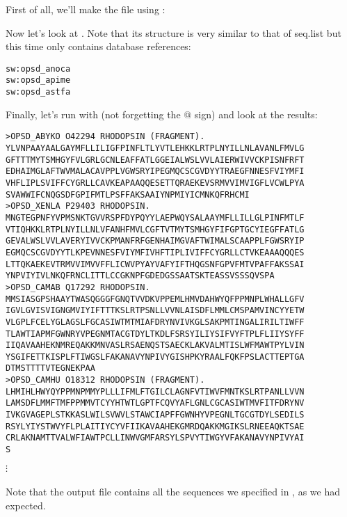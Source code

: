 \documentclass[12pt]{report}
\begin{document}
First of all, we'll make the file  using
:

\unix{}

Now let's look at .	Note that its structure	is very
similar	to that	of seq.list but	this time only contains	database
references:

\unix{}
\begin{verbatim}
sw:opsd_anoca
sw:opsd_apime
sw:opsd_astfa
\end{verbatim}

Finally, let's run  with  (not forgetting the @
sign) and look at the results:

\unix{}

\unix{}
\begin{verbatim}
>OPSD_ABYKO O42294 RHODOPSIN (FRAGMENT).
YLVNPAAYAALGAYMFLLILIGFPINFLTLYVTLEHKKLRTPLNYILLNLAVANLFMVLG
GFTTTMYTSMHGYFVLGRLGCNLEAFFATLGGEIALWSLVVLAIERWIVVCKPISNFRFT
EDHAIMGLAFTWVMALACAVPPLVGWSRYIPEGMQCSCGVDYYTRAEGFNNESFVIYMFI
VHFLIPLSVIFFCYGRLLCAVKEAPAAQQESETTQRAEKEVSRMVVIMVIGFLVCWLPYA
SVAWWIFCNQGSDFGPIFMTLPSFFAKSAAIYNPMIYICMNKQFRHCMI
>OPSD_XENLA P29403 RHODOPSIN.
MNGTEGPNFYVPMSNKTGVVRSPFDYPQYYLAEPWQYSALAAYMFLLILLGLPINFMTLF
VTIQHKKLRTPLNYILLNLVFANHFMVLCGFTVTMYTSMHGYFIFGPTGCYIEGFFATLG
GEVALWSLVVLAVERYIVVCKPMANFRFGENHAIMGVAFTWIMALSCAAPPLFGWSRYIP
EGMQCSCGVDYYTLKPEVNNESFVIYMFIVHFTIPLIVIFFCYGRLLCTVKEAAAQQQES
LTTQKAEKEVTRMVVIMVVFFLICWVPYAYVAFYIFTHQGSNFGPVFMTVPAFFAKSSAI
YNPVIYIVLNKQFRNCLITTLCCGKNPFGDEDGSSAATSKTEASSVSSSQVSPA
>OPSD_CAMAB Q17292 RHODOPSIN.
MMSIASGPSHAAYTWASQGGGFGNQTVVDKVPPEMLHMVDAHWYQFPPMNPLWHALLGFV
IGVLGVISVIGNGMVIYIFTTTKSLRTPSNLLVVNLAISDFLMMLCMSPAMVINCYYETW
VLGPLFCELYGLAGSLFGCASIWTMTMIAFDRYNVIVKGLSAKPMTINGALIRILTIWFF
TLAWTIAPMFGWNRYVPEGNMTACGTDYLTKDLFSRSYILIYSIFVYFTPLFLIIYSYFF
IIQAVAAHEKNMREQAKKMNVASLRSAENQSTSAECKLAKVALMTISLWFMAWTPYLVIN
YSGIFETTKISPLFTIWGSLFAKANAVYNPIVYGISHPKYRAALFQKFPSLACTTEPTGA
DTMSTTTTVTEGNEKPAA
>OPSD_CAMHU O18312 RHODOPSIN (FRAGMENT).
LHMIHLHWYQYPPMNPMMYPLLLIFMLFTGILCLAGNFVTIWVFMNTKSLRTPANLLVVN
LAMSDFLMMFTMFPPMMVTCYYHTWTLGPTFCQVYAFLGNLCGCASIWTMVFITFDRYNV
IVKGVAGEPLSTKKASLWILSVWVLSTAWCIAPFFGWNHYVPEGNLTGCGTDYLSEDILS
RSYLYIYSTWVYFLPLAITIYCYVFIIKAVAAHEKGMRDQAKKMGIKSLRNEEAQKTSAE
CRLAKNAMTTVALWFIAWTPCLLINWVGMFARSYLSPVYTIWGYVFAKANAVYNPIVYAI
S
\end{verbatim}
$\vdots$
\\
\\
\noindent Note that the	output file contains all the sequences we specified in
, as we had expected.
\end{document}
